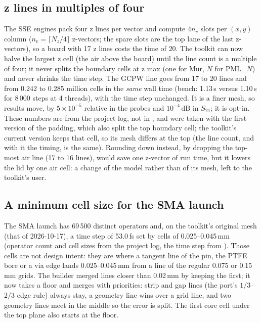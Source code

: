 \subsection{z lines in multiples of four}
The SSE engines pack four z lines per vector and compute $4n_v$ slots per $(x,y)$ column ($n_v=\lceil N_z/4\rceil$
z-vectors; the spare slots are the top lane of the last z-vectors), so a board with 17 z lines costs the time of 20.
The toolkit can now halve the largest z cell (the air above the board) until the line count is a multiple of four; it
never splits the boundary cells at z max (one for Mur, $N$ for PML\_$N$) and never shrinks the time step. The GCPW
line goes from 17 to 20 lines and from 0.242 to 0.285 million cells in the \emph{same} wall time (bench: 1.13\,s versus
1.10\,s for 8\,000 steps at 4 threads), with the time step unchanged. It is a finer mesh, so results move, by
$5\times10^{-5}$ relative in the probes and $10^{-4}$\,dB in $S_{21}$; it is opt-in. These numbers are from the
project log, not in , and were taken with the first version of the padding, which also split the top
boundary cell; the toolkit's current version keeps that cell, so its mesh differs at the top (the line count, and
with it the timing, is the same). Rounding down instead, by dropping the top-most air line (17 to 16 lines), would save one
z-vector of run time, but it lowers the lid by one air cell: a change of the model rather than of its mesh, left to
the toolkit's user.

\subsection{A minimum cell size for the SMA launch}\label{sec:meshfloor}
The SMA launch has 69\,500 distinct operators and, on the toolkit's original mesh (that of 2026-10-17), a time step
of 53.0\,fs set by cells of 0.025--0.045\,mm (operator count and cell sizes from the project log, the time step from
). Those cells are not design intent: they are where a tangent line of
the pin, the PTFE bore or a via edge lands 0.025--0.045\,mm from a line of the regular 0.075 or 0.15\,mm grids. The
builder merged lines closer than 0.02\,mm by keeping the first; it now takes a  floor and merges with
priorities: strip and gap lines (the port's $1/3$--$2/3$ edge rule) always stay, a geometry line wins over a grid
line, and two geometry lines meet in the middle so the error is split. The first core cell under the top plane also
starts at the floor.

